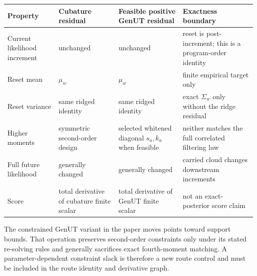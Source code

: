 \begin{center}
\scriptsize
\setlength{\tabcolsep}{3pt}
\begin{tabular}{@{}p{} p{} p{} p{}@{}}
\toprule
Property & Cubature residual & Feasible positive GenUT residual & Exactness boundary \\
\midrule
Current likelihood increment & unchanged & unchanged & reset is post-increment; this is a program-order identity \\
Reset mean & \(\mu_w\) & \(\mu_w\) & finite empirical target only \\
Reset variance & same ridged identity & same ridged identity & exact \(\Sigma_w\) only without the ridge residual \\
Higher moments & symmetric second-order design & selected whitened diagonal \(s_a,k_a\) when feasible & neither matches the full correlated filtering law \\
Full future likelihood & generally changed & generally changed & carried cloud changes downstream increments \\
Score & total derivative of cubature finite scalar & total derivative of GenUT finite scalar & not an exact-posterior score claim \\
\bottomrule
\end{tabular}
\setlength{\tabcolsep}{6pt}
\normalsize
\end{center}

The constrained GenUT variant in the paper moves points toward support bounds.
That operation preserves second-order constraints only under its stated
re-solving rules and generally sacrifices exact fourth-moment matching.  A
parameter-dependent constraint slack is therefore a new route control and must
be included in the route identity and derivative graph.

